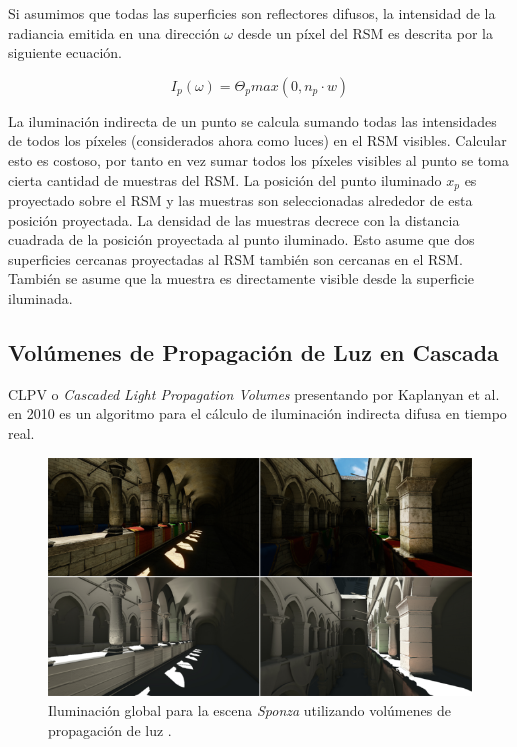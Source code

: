 Si asumimos que todas las superficies son reflectores difusos, la intensidad de la radiancia emitida en una dirección $\omega$ desde un píxel del \ac{RSM} es descrita por la siguiente ecuación.

\begin{equation}
    I_{p}(\omega) = \Theta_{p}max(0, n_{p} \cdot {w})
    \label{eq:rsm_radiance}
\end{equation}

La iluminación indirecta de un punto se calcula sumando todas las intensidades de todos los píxeles (considerados ahora como luces) en el \ac{RSM} visibles. Calcular esto es costoso, por tanto en vez sumar todos los píxeles visibles al punto se toma cierta cantidad de muestras del \ac{RSM}. La posición del punto iluminado $x_{p}$ es proyectado sobre el \ac{RSM} y las muestras son seleccionadas alrededor de esta posición proyectada. La densidad de las muestras decrece con la distancia cuadrada de la posición proyectada al punto iluminado. Esto asume que dos superficies cercanas proyectadas al \ac{RSM} también son cercanas en el \ac{RSM}. También se asume que la muestra es directamente visible desde la superficie iluminada.

\subsection{Volúmenes de Propagación de Luz en Cascada}
\label{sub:clpv}
\Ac{CLPV} o \emph{Cascaded Light Propagation Volumes} presentando por Kaplanyan et al. en 2010 \cite{Kaplanyan:2010} es un algoritmo para el cálculo de iluminación indirecta difusa en tiempo real.

\begin{figure}[H]
	\centering
	\includegraphics[width=0.85\linewidth]{media/lpvresult.png}
	\caption{Iluminación global para la escena \emph{Sponza} utilizando volúmenes de propagación de luz \cite{Kaplanyan:2010}.}
	\label{fig:lvp_results}
\end{figure}

